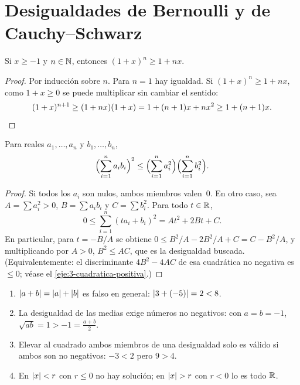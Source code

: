 \section{Desigualdades de Bernoulli y de Cauchy--Schwarz}

\begin{teorema}\label{teo:bernoulli}
Si $x\ge-1$ y $n\in\mathbb{N}$, entonces $(1+x)^n\ge1+nx$.
\end{teorema}

\begin{proof}
Por inducción sobre $n$. Para $n=1$ hay igualdad. Si $(1+x)^n\ge1+nx$, como $1+x\ge0$ se puede multiplicar sin cambiar el sentido:
\[
(1+x)^{n+1}\ge(1+nx)(1+x)=1+(n+1)x+nx^2\ge1+(n+1)x.\qedhere
\]
\end{proof}

\begin{teorema}\label{teo:cs}
Para reales $a_1,\dots,a_n$ y $b_1,\dots,b_n$,
\[
\Bigl(\sum_{i=1}^na_ib_i\Bigr)^2\le\Bigl(\sum_{i=1}^na_i^2\Bigr)\Bigl(\sum_{i=1}^nb_i^2\Bigr).
\]
\end{teorema}

\begin{proof}
Si todos los $a_i$ son nulos, ambos miembros valen~0. En otro caso, sea $A=\sum a_i^2>0$, $B=\sum a_ib_i$ y $C=\sum b_i^2$. Para todo $t\in\mathbb{R}$,
\[
0\le\sum_{i=1}^n(ta_i+b_i)^2=At^2+2Bt+C.
\]
En particular, para $t=-B/A$ se obtiene $0\le B^2/A-2B^2/A+C=C-B^2/A$, y multiplicando por $A>0$, $B^2\le AC$, que es la desigualdad buscada. (Equivalentemente: el discriminante $4B^2-4AC$ de esa cuadrática no negativa es $\le0$; véase el \cref{eje:3-cuadratica-positiva}.)
\end{proof}

\begin{observacion}
\begin{enumerate}[label=(\alph*)]
\item $\lvert a+b\rvert=\lvert a\rvert+\lvert b\rvert$ es falso en general: $\lvert3+(-5)\rvert=2<8$.
\item La desigualdad de las medias exige números no negativos: con $a=b=-1$, $\sqrt{ab}=1>-1=\frac{a+b}2$.
\item Elevar al cuadrado ambos miembros de una desigualdad solo es válido si ambos son no negativos: $-3<2$ pero $9>4$.
\item En $\lvert x\rvert<r$ con $r\le0$ no hay solución; en $\lvert x\rvert>r$ con $r<0$ lo es todo $\mathbb{R}$.
\end{enumerate}
\end{observacion}

